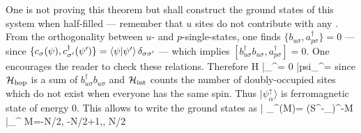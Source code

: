         One is not proving this theorem but shall construct the ground states of this system when half-filled --- remember that $u$ sites do not contribute with any \electron. From the orthogonality between $u$- and $p$-single-\electron states, one finds $\{ b_{u\sigma},a^\dagger_{p\sigma} \}=0$ --- since $\{c_\sigma(\psi),c^\dagger_{\sigma'}(\psi')\}=\braket{\psi}{\psi'} \delta_{\sigma \sigma'}$ --- which implies $[ b^\dagger_{u\sigma}b_{u\sigma},a^\dagger_{p\sigma}]=0$. One encourages the reader to check these relations. Therefore
        \be \mc H |\psi_\alpha ^\uparrow\rangle = 0  |psi_\alpha ^\uparrow\rangle =   \ee
        since $\mathcal H_\text{hop}$ is a sum of $b^\dagger_{u\sigma}b_{u\sigma}$ and $\mathcal H_\text{int}$ counts the number of doubly-occupied sites which do not exist when everyone has the same spin. Thus $|\psi_\alpha ^\uparrow\rangle$ is ferromagnetic state of energy $0$. This allows to write the ground states as
        \be | \psi_^{(M)}\rangle = (S^-_)^{-M} |\psi_\alpha ^\uparrow\rangle {} M=-N/2, -N/2+1,\dotsc, N/2 \ee
        
